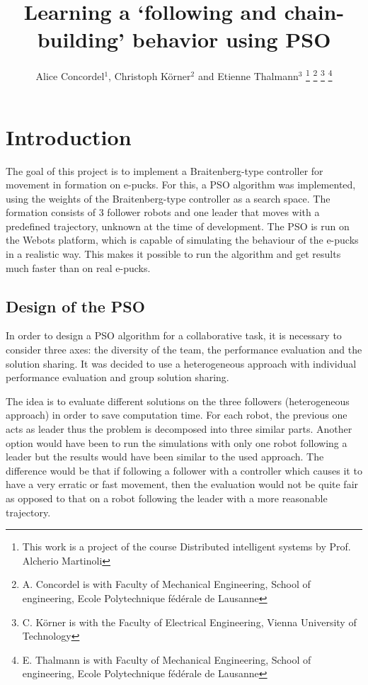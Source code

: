 \documentclass[a4paper, 10pt, conference]{ieeeconf}      %
\title{\LARGE \bf
Learning a `following and chain-building' behavior using PSO
}
\author{Alice Concordel$^{1}$, Christoph K\"{o}rner$^{2}$ and Etienne Thalmann$^{3}$%
\thanks{This work is a project of the course Distributed intelligent systems by Prof. Alcherio Martinoli}%
\thanks{A. Concordel is with Faculty of Mechanical Engineering, School of engineering, Ecole Polytechnique fédérale de Lausanne}
\thanks{C. K\"{o}rner is with the Faculty of Electrical Engineering, Vienna University of Technology} %
\thanks{E. Thalmann is with Faculty of Mechanical Engineering, School of engineering, Ecole Polytechnique fédérale de Lausanne}%
}
\begin{document}
\maketitle
\thispagestyle{empty}
\pagestyle{empty}


\begin{abstract}

\end{abstract}


\section{Introduction}
The goal of this project is to implement a Braitenberg-type controller for movement in formation on e-pucks. For this, a PSO algorithm was implemented, using the weights of the Braitenberg-type controller as a search space. The formation consists of 3 follower robots and one leader that moves with a predefined trajectory, unknown at the time of development. The PSO is run on the Webots platform, which is capable of simulating the behaviour of the e-pucks in a realistic way. This makes it possible to run the algorithm and get results much faster than on real e-pucks.

\subsection{Design of the PSO}
In order to design a PSO algorithm for a collaborative task, it is necessary to consider three axes: the diversity of the team, the performance evaluation and the solution sharing. It was decided  to use a heterogeneous approach with individual performance evaluation and group solution sharing. 

The idea is to evaluate different solutions on the three followers (heterogeneous approach) in order to save computation time. For each robot, the previous one acts as leader thus the problem is decomposed into three similar parts. Another option would have been to run the simulations with only one robot following a leader but the results would have been similar to the used approach. The difference would be that if following a follower with a controller which causes it to have a very erratic or fast movement, then the evaluation would not be quite fair as opposed to that on a robot following the leader with a more reasonable trajectory.
\end{document}
